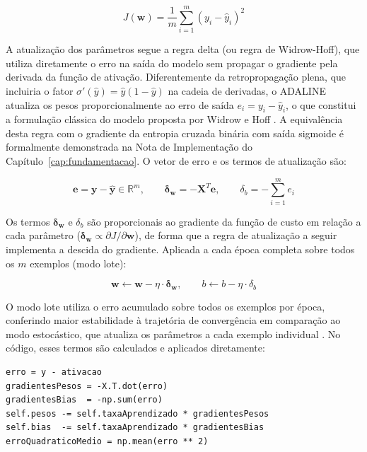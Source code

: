 \begin{equation}
J(\mathbf{w}) = \frac{1}{m} \sum_{i=1}^{m} (y_i - \hat{y}_i)^2
\label{eq:adaline_mse}
\end{equation}

A atualização dos parâmetros segue a regra delta (ou regra de Widrow-Hoff), que utiliza diretamente o erro na saída do modelo sem propagar o gradiente pela derivada da função de ativação. Diferentemente da retropropagação plena, que incluiria o fator $\sigma'(\hat{y}) = \hat{y}(1-\hat{y})$ na cadeia de derivadas, o ADALINE atualiza os pesos proporcionalmente ao erro de saída $e_i = y_i - \hat{y}_i$, o que constitui a formulação clássica do modelo proposta por Widrow e Hoff \cite{braga2007}. A equivalência desta regra com o gradiente da entropia cruzada binária com saída sigmoide é formalmente demonstrada na Nota de Implementação do Capítulo~\ref{cap:fundamentacao}. O vetor de erro e os termos de atualização são:

\begin{equation}
\mathbf{e} = \mathbf{y} - \hat{\mathbf{y}} \in \mathbb{R}^m, \qquad \boldsymbol{\delta}_{\mathbf{w}} = -\mathbf{X}^T \mathbf{e}, \qquad \delta_b = -\sum_{i=1}^{m} e_i
\label{eq:adaline_grad}
\end{equation}

Os termos $\boldsymbol{\delta}_{\mathbf{w}}$ e $\delta_b$ são proporcionais ao gradiente da função de custo em relação a cada parâmetro ($\boldsymbol{\delta}_{\mathbf{w}} \propto \partial J/\partial \mathbf{w}$), de forma que a regra de atualização a seguir implementa a descida do gradiente. Aplicada a cada época completa sobre todos os $m$ exemplos (modo lote):

\begin{equation}
\mathbf{w} \leftarrow \mathbf{w} - \eta \cdot \boldsymbol{\delta}_{\mathbf{w}}, \qquad b \leftarrow b - \eta \cdot \delta_b
\label{eq:adaline_update}
\end{equation}

O modo lote utiliza o erro acumulado sobre todos os exemplos por época, conferindo maior estabilidade à trajetória de convergência em comparação ao modo estocástico, que atualiza os parâmetros a cada exemplo individual \cite{silva2016}. No código, esses termos são calculados e aplicados diretamente:

\begin{lstlisting}[caption={Cálculo dos gradientes e atualização dos pesos do ADALINE.}, label={lst:adaline_update}]
erro = y - ativacao
gradientesPesos = -X.T.dot(erro)
gradientesBias  = -np.sum(erro)
self.pesos -= self.taxaAprendizado * gradientesPesos
self.bias  -= self.taxaAprendizado * gradientesBias
erroQuadraticoMedio = np.mean(erro ** 2)
\end{lstlisting}


